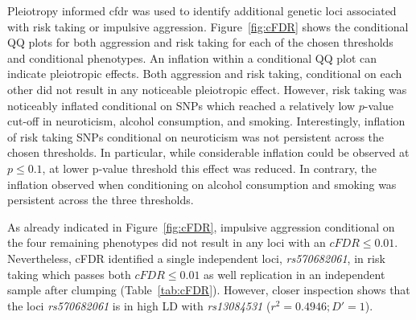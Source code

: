 Pleiotropy informed \acrfull{cfdr} was used to identify additional genetic loci associated with risk taking or impulsive aggression.
Figure~\ref{fig:cFDR} shows the conditional QQ plots for both aggression and risk taking for each of the chosen thresholds and conditional phenotypes.
An inflation within a conditional QQ plot can indicate pleiotropic effects.
Both aggression and risk taking, conditional on each other did not result in any noticeable pleiotropic effect.
However, risk taking was noticeably inflated conditional on SNPs which reached a relatively low $p$-value cut-off in neuroticism, alcohol consumption, and smoking.
Interestingly, inflation of risk taking SNPs conditional on neuroticism was not persistent across the chosen thresholds.
In particular, while considerable inflation could be observed at $p\leq0.1$, at lower p-value threshold this effect was reduced.
In contrary, the inflation observed when conditioning on alcohol consumption and smoking was persistent across the three thresholds.

As already indicated in Figure~\ref{fig:cFDR}, impulsive aggression conditional on the four remaining phenotypes did not result in any loci with an $cFDR\leq0.01$.
Nevertheless, cFDR identified a single independent loci, \textit{rs570682061}, in risk taking which passes both $cFDR\leq0.01$ as well replication in an independent sample after clumping (Table~\ref{tab:cFDR}).
However, closer inspection shows that the loci \textit{rs570682061} is in high LD with \textit{rs13084531} ($r^2=0.4946;D'=1$).

